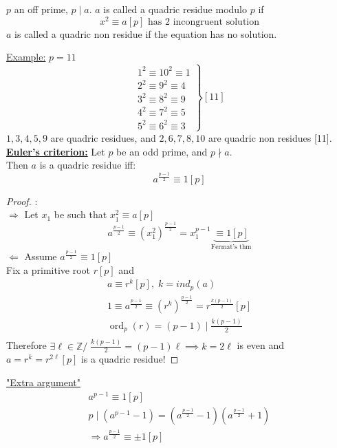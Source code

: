 \documentclass{report}
\DeclareMathOperator{\ord}{ord}
\begin{document}
																																		
\begin{defi} $p$ an off prime, $p\mid a$. $a$ is called a quadric residue modulo $p$ if \[x^2 \equiv a[p] \text{  has 2 incongruent solution}\]
						$a$ is called a quadric non residue if the equation has no solution.
\end{defi}
\underline{Example:} $p=11$
										\[\left.
										\begin{array}{lcl}
											1^2 \equiv 10^2 \equiv 1\\
											2^2 \equiv 9^2 \equiv 4 \\
											3^2 \equiv 8^2 \equiv 9 \\
											4^2 \equiv 7^2 \equiv 5 \\
											5^2 \equiv 6^2 \equiv 3
											\end{array}
											\right\} [11]\]
										$1,3,4,5,9$ are quadric residues, and $2,6,7,8,10$ are quadric non residues [11].
\vspace{5mm}										
\underline{\textbf{Euler's criterion:}} Let $p$ be an odd prime, and $p \nmid a$. \\Then $a$ is a quadric residue iff:\[a^{\frac{p-1}{2}}\equiv 1[p]\]
\begin{proof}:\\
							\underline{$\Rightarrow$} Let $x_1$ be such that $x_1^2 \equiv a [p]$\\
							\[a^\frac{p-1}{2} \equiv (x_1^2)^\frac{p-1}{2}=x_1^{p-1}\underbrace{\equiv 1[p]}_{\scriptscriptstyle \text{Fermat's thm}}\]
							\underline{$\Leftarrow$} Assume $a^\frac{p-1}{2}\equiv 1[p]$\\
							Fix a primitive root $r[p]$ and 
																							\[\begin{array}{lcl}
																							a\equiv r^k[p], \; k=ind_p(a)\\
																							1\equiv a^\frac{p-1}{2}\equiv (r^k)^\frac{p-1}{2}=r^\frac{k(p-1)}{2}[p]\\
																							\ord_p(r)=(p-1)\mid\frac{k(p-1)}{2}\\
																							\end{array}\]
							Therefore $\exists \ell \in \mathbb{Z} /\;\frac{k(p-1)}{2}=(p-1)\ell\implies k=2\ell$ is even and $a=r^k=r^{2\ell}[p]$ is a quadric residue!		
\end{proof}
\newpage
\underline{"Extra argument"}
														\[\begin{array}{lcl}
														a^{p-1}\equiv 1[p]\\
														p\mid(a^{p-1}-1)=(a^\frac{p-1}{2}-1)(a^\frac{p-1}{2}+1)\\
														\Rightarrow a^\frac{p-1}{2}\equiv \pm 1[p]\\
														\end{array}\]
\end{document}
